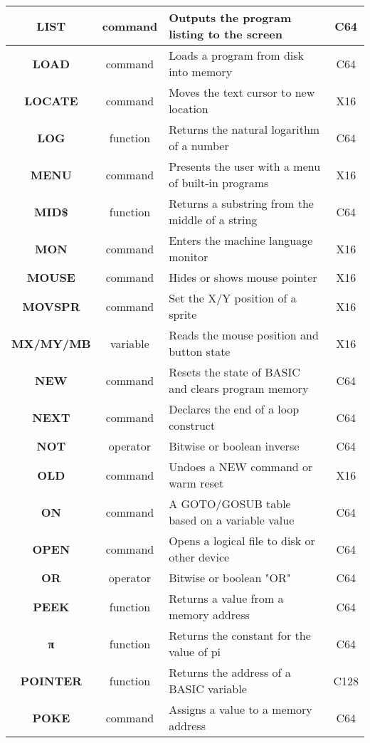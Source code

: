 \begin{longtable}{|c|c|m{4cm}|c|}
	{\bfseries LIST} & command & Outputs the program listing to the screen & C64 \\ \hline
	{\bfseries LOAD} & command & Loads a program from disk into memory & C64 \\ \hline
	{\bfseries LOCATE} & command & Moves the text cursor to new location & X16 \\ \hline
	{\bfseries LOG} & function & Returns the natural logarithm of a number & C64 \\ \hline
	{\bfseries MENU} & command & Presents the user with a menu of built-in programs & X16 \\ \hline
	{\bfseries MID\$} & function & Returns a substring from the middle of a string & C64 \\ \hline
	{\bfseries MON} & command & Enters the machine language monitor & X16 \\ \hline
	{\bfseries MOUSE} & command & Hides or shows mouse pointer & X16 \\ \hline
	{\bfseries MOVSPR} & command & Set the X/Y position of a sprite & X16 \\ \hline
	{\bfseries MX/MY/MB} & variable & Reads the mouse position and button state & X16 \\ \hline
	{\bfseries NEW} & command & Resets the state of BASIC and clears program memory & C64 \\ \hline
	{\bfseries NEXT} & command & Declares the end of a loop construct & C64 \\ \hline
	{\bfseries NOT} & operator & Bitwise or boolean inverse & C64 \\ \hline
	{\bfseries OLD} & command & Undoes a NEW command or warm reset & X16 \\ \hline
	{\bfseries ON} & command & A GOTO/GOSUB table based on a variable value & C64 \\ \hline
	{\bfseries OPEN} & command & Opens a logical file to disk or other device & C64 \\ \hline
	{\bfseries OR} & operator & Bitwise or boolean "OR" & C64 \\ \hline
	{\bfseries PEEK} & function & Returns a value from a memory address & C64 \\ \hline
	{\ttfamily\bfseries π} & function & Returns the constant for the value of pi & C64 \\ \hline
	{\bfseries POINTER} & function & Returns the address of a BASIC variable & C128 \\ \hline
	{\bfseries POKE} & command & Assigns a value to a memory address & C64 \\ \hline

\end{longtable}
